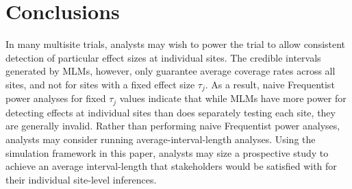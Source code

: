 \documentclass[]{article}
\begin{document}


\section{Conclusions}

In many multisite trials, analysts may wish to power the trial to allow consistent detection of particular effect sizes at individual sites.
The credible intervals generated by MLMs, however, only guarantee average coverage rates across all sites, and not for sites with a fixed effect size $\tau_j$.
As a result, naive Frequentist power analyses for fixed $\tau_j$ values indicate that while MLMs have more power for detecting effects at individual sites than does separately testing each site, they are generally invalid.
Rather than performing naive Frequentist power analyses, analysts may consider running average-interval-length analyses.
Using the simulation framework in this paper, analysts may size a prospective study to achieve an average interval-length that stakeholders would be satisfied with for their individual site-level inferences.



	
\end{document}
